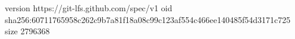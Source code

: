 version https://git-lfs.github.com/spec/v1
oid sha256:60711765958c262c9b7a81f18a08c99c123af554c466ee140485f54d3171c725
size 2796368

